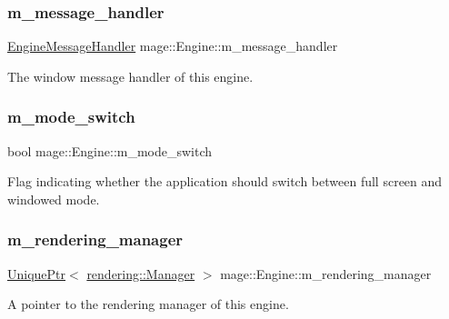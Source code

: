 \subsubsection{\texorpdfstring{m\+\_\+message\+\_\+handler}{m\_message\_handler}}
{\footnotesize\ttfamily \hyperlink{classmage_1_1_engine_message_handler}{Engine\+Message\+Handler} mage\+::\+Engine\+::m\+\_\+message\+\_\+handler\hspace{0.3cm}{\ttfamily [private]}}

The window message handler of this engine. \hypertarget{classmage_1_1_engine_aa5cb2e0b7bb2c4a9020e79ab832ee221}{}\label{classmage_1_1_engine_aa5cb2e0b7bb2c4a9020e79ab832ee221} 
\subsubsection{\texorpdfstring{m\+\_\+mode\+\_\+switch}{m\_mode\_switch}}
{\footnotesize\ttfamily bool mage\+::\+Engine\+::m\+\_\+mode\+\_\+switch\hspace{0.3cm}{\ttfamily [private]}}

Flag indicating whether the application should switch between full screen and windowed mode. \hypertarget{classmage_1_1_engine_ae870ec5b532a21112500f0f0f03e9b55}{}\label{classmage_1_1_engine_ae870ec5b532a21112500f0f0f03e9b55} 
\subsubsection{\texorpdfstring{m\+\_\+rendering\+\_\+manager}{m\_rendering\_manager}}
{\footnotesize\ttfamily \hyperlink{namespacemage_a3316d7143a973e37adf1110f2e80ca31}{Unique\+Ptr}$<$ \hyperlink{classmage_1_1rendering_1_1_manager}{rendering\+::\+Manager} $>$ mage\+::\+Engine\+::m\+\_\+rendering\+\_\+manager\hspace{0.3cm}{\ttfamily [private]}}

A pointer to the rendering manager of this engine. \hypertarget{classmage_1_1_engine_a45160eecbdcbebcf269436505342db54}{}\label{classmage_1_1_engine_a45160eecbdcbebcf269436505342db54} 
